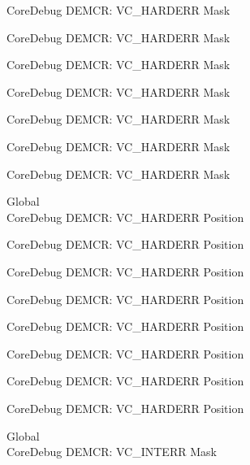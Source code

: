 \begin{DoxyRefList}
\label{deprecated__deprecated000136}%
%
Core\+Debug DEMCR\+: VC\+\_\+\+HARDERR Mask 

\label{deprecated__deprecated000200}%
%
Core\+Debug DEMCR\+: VC\+\_\+\+HARDERR Mask 

\label{deprecated__deprecated000275}%
%
Core\+Debug DEMCR\+: VC\+\_\+\+HARDERR Mask 

\label{deprecated__deprecated000342}%
%
Core\+Debug DEMCR\+: VC\+\_\+\+HARDERR Mask 

\label{deprecated__deprecated000418}%
%
Core\+Debug DEMCR\+: VC\+\_\+\+HARDERR Mask 

\label{deprecated__deprecated000507}%
%
Core\+Debug DEMCR\+: VC\+\_\+\+HARDERR Mask 

\label{deprecated__deprecated000609}%
%
Core\+Debug DEMCR\+: VC\+\_\+\+HARDERR Mask  
\item[Global \doxylink{group___c_m_s_i_s___core_debug_gaed9f42053031a9a30cd8054623304c0a}{Core\+Debug\+\_\+\+DEMCR\+\_\+\+VC\+\_\+\+HARDERR\+\_\+\+Pos} ]\hfill \\
\label{deprecated__deprecated000055}%
%
Core\+Debug DEMCR\+: VC\+\_\+\+HARDERR Position 

\label{deprecated__deprecated000135}%
%
Core\+Debug DEMCR\+: VC\+\_\+\+HARDERR Position 

\label{deprecated__deprecated000199}%
%
Core\+Debug DEMCR\+: VC\+\_\+\+HARDERR Position 

\label{deprecated__deprecated000274}%
%
Core\+Debug DEMCR\+: VC\+\_\+\+HARDERR Position 

\label{deprecated__deprecated000341}%
%
Core\+Debug DEMCR\+: VC\+\_\+\+HARDERR Position 

\label{deprecated__deprecated000417}%
%
Core\+Debug DEMCR\+: VC\+\_\+\+HARDERR Position 

\label{deprecated__deprecated000506}%
%
Core\+Debug DEMCR\+: VC\+\_\+\+HARDERR Position 

\label{deprecated__deprecated000608}%
%
Core\+Debug DEMCR\+: VC\+\_\+\+HARDERR Position  
\item[Global \doxylink{group___c_m_s_i_s___core_debug_gad6815d8e3df302d2f0ff2c2c734ed29a}{Core\+Debug\+\_\+\+DEMCR\+\_\+\+VC\+\_\+\+INTERR\+\_\+\+Msk} ]\hfill \\
\label{deprecated__deprecated000058}%
%
Core\+Debug DEMCR\+: VC\+\_\+\+INTERR Mask 


\end{DoxyRefList}
